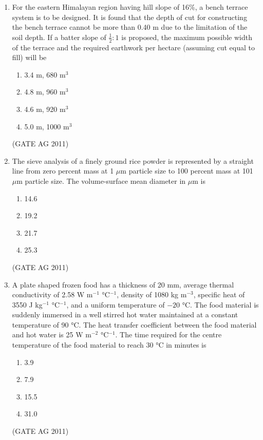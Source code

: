\documentclass[journal,12pt,onecolumn]{IEEEtran}
\theoremstyle{remark}
\begin{document}
\begin{enumerate}
\item 
For the eastern Himalayan region having hill slope of 16\%, a bench terrace system is to be designed. It is found that the depth of cut for constructing the bench terrace cannot be more than 0.40 m due to the limitation of the soil depth. If a batter slope of $\frac{1}{2} : 1$ is proposed, the maximum possible width of the terrace and the required earthwork per hectare (assuming cut equal to fill) will be
\begin{multicols}{4}
\begin{enumerate}
    \item 3.4 m, 680 m$^3$
    \item 4.8 m, 960 m$^3$
    \item 4.6 m, 920 m$^3$
    \item 5.0 m, 1000 m$^3$
\end{enumerate}
\end{multicols}
\hfill{(GATE AG 2011)}

\item 
The sieve analysis of a finely ground rice powder is represented by a straight line from zero percent mass at 1 $\mu$m particle size to 100 percent mass at 101 $\mu$m particle size. The volume-surface mean diameter in $\mu$m is
\begin{multicols}{4}
\begin{enumerate}
    \item 14.6
    \item 19.2
    \item 21.7
    \item 25.3
\end{enumerate}
\end{multicols}
\hfill{(GATE AG 2011)}

\item 
A plate shaped frozen food has a thickness of 20 mm, average thermal conductivity of 2.58 W m$^{-1}$ °C$^{-1}$, density of 1080 kg m$^{-3}$, specific heat of 3550 J kg$^{-1}$ °C$^{-1}$, and a uniform temperature of $-20$ °C. The food material is suddenly immersed in a well stirred hot water maintained at a constant temperature of 90 °C. The heat transfer coefficient between the food material and hot water is 25 W m$^{-2}$ °C$^{-1}$. The time required for the centre temperature of the food material to reach 30 °C in minutes is
\begin{multicols}{4}
\begin{enumerate}
    \item 3.9
    \item 7.9
    \item 15.5
    \item 31.0
\end{enumerate}
\end{multicols}
\hfill{(GATE AG 2011)}


\end{enumerate}
\end{document}
